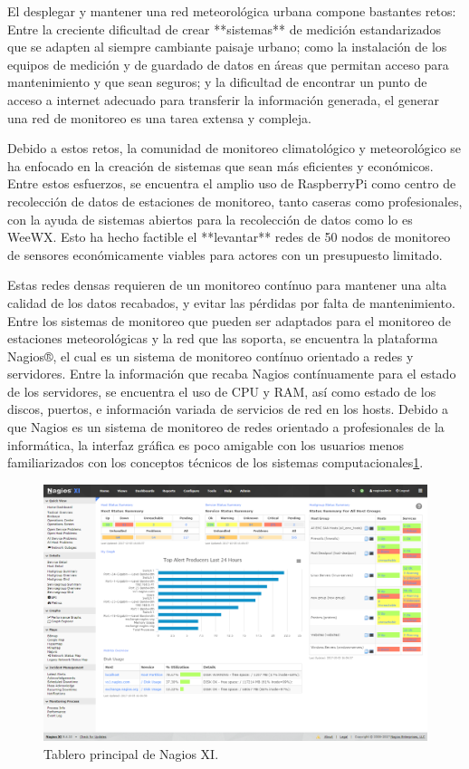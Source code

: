 El desplegar y mantener una red meteorológica urbana compone bastantes retos: Entre la creciente dificultad de crear **sistemas** de medición estandarizados que se adapten al siempre cambiante paisaje urbano; como la instalación de los equipos de medición y de guardado de datos en áreas que permitan acceso para mantenimiento y que sean seguros; y la dificultad de encontrar un punto de acceso a internet adecuado para transferir la información generada, el generar una red de monitoreo es una tarea extensa y compleja.

Debido a estos retos, la comunidad de monitoreo climatológico y meteorológico se ha enfocado en la creación de sistemas que sean más eficientes y económicos. Entre estos esfuerzos, se encuentra el amplio uso de RaspberryPi como centro de recolección de datos de estaciones de monitoreo\cite{rpi_weataher_station}, tanto caseras como profesionales, con la ayuda de sistemas abiertos para la recolección de datos como lo es WeeWX. Esto ha hecho factible el **levantar** redes de 50 nodos de monitoreo de sensores económicamente viables para actores con un presupuesto limitado\cite{monitoreo_raspberry_nagios}.


Estas redes densas requieren de un monitoreo contínuo para mantener una alta calidad de los datos recabados, y evitar las pérdidas por falta de mantenimiento. Entre los sistemas de monitoreo que pueden ser adaptados para el monitoreo de estaciones meteorológicas y la red que las soporta, se encuentra la plataforma Nagios®, el cual es un sistema de monitoreo contínuo orientado a redes y servidores. Entre la información que recaba Nagios contínuamente para el estado de los servidores, se encuentra el uso de CPU y RAM, así como estado de los discos, puertos, e información variada de servicios de red en los hosts. Debido a que Nagios es un sistema de monitoreo de redes orientado a profesionales de la informática, la interfaz gráfica es poco amigable con los usuarios menos familiarizados con los conceptos técnicos de los sistemas computacionales\ref{fig:nagios_dashboard}.

\begin{figure}[!ht]
	\centering
	\includegraphics[width=.80\linewidth]{images/Nagios_home_dashboard.png}
	\caption{Tablero principal de Nagios XI.}
	\label{fig:nagios_dashboard}
\end{figure}

